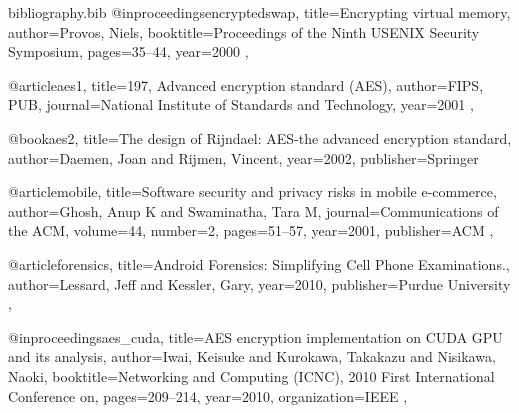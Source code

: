 \documentclass[conference,10pt]{IEEEtran}
\begin{document}
\begin{filecontents*}{bibliography.bib}
    @inproceedings{encryptedswap,
        title={Encrypting virtual memory},
        author={Provos, Niels},
        booktitle={Proceedings of the Ninth USENIX Security Symposium},
        pages={35--44},
        year={2000}
    },

    @article{aes1,
        title={{197, Advanced encryption standard (AES)}},
        author={FIPS, PUB},
        journal={National Institute of Standards and Technology},
        year={2001}
    },

    @book{aes2,
        title={The design of Rijndael: AES-the advanced encryption standard},
        author={Daemen, Joan and Rijmen, Vincent},
        year={2002},
        publisher={Springer}
    }

    @article{mobile,
        title={Software security and privacy risks in mobile e-commerce},
        author={Ghosh, Anup K and Swaminatha, Tara M},
        journal={Communications of the ACM},
        volume={44},
        number={2},
        pages={51--57},
        year={2001},
        publisher={ACM}
    },

    @article{forensics,
        title={Android Forensics: Simplifying Cell Phone Examinations.},
        author={Lessard, Jeff and Kessler, Gary},
        year={2010},
        publisher={Purdue University}
    },

    @inproceedings{aes_cuda,
        title={{AES encryption implementation on CUDA GPU and its analysis}},
        author={Iwai, Keisuke and Kurokawa, Takakazu and Nisikawa, Naoki},
        booktitle={Networking and Computing (ICNC), 2010 First International Conference on},
        pages={209--214},
        year={2010},
        organization={IEEE}
    },

\end{filecontents*}

% 



\end{document}
